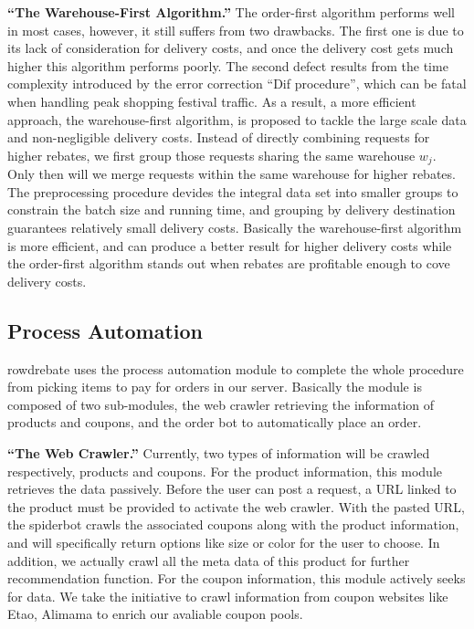 \textbf{``The Warehouse-First Algorithm.''} The order-first algorithm performs well in most cases, however, it still suffers from two drawbacks. The first one is due to its lack of consideration for delivery costs, and once the delivery cost gets much higher this algorithm performs poorly. The second defect results from the time complexity introduced by the error correction ``Dif procedure'', which can be fatal when handling peak shopping festival traffic. As a result, a more efficient approach, the warehouse-first algorithm, is proposed to tackle the large scale data and non-negligible delivery costs. Instead of directly combining requests for higher rebates, we first group those requests sharing the same warehouse $w_j$. Only then will we merge requests within the same warehouse for higher rebates. The preprocessing procedure devides the integral data set into smaller groups to constrain the batch size and running time, and grouping by delivery destination guarantees relatively small delivery costs. Basically the warehouse-first algorithm is more efficient, and can produce a better result for higher delivery costs while the order-first algorithm stands out when rebates are profitable enough to cove delivery costs.

\subsection{Process Automation}

rowdrebate uses the process automation module to complete the whole procedure from picking items to pay for orders in our server. Basically the module is composed of two sub-modules, the web crawler retrieving the information of products and coupons, and the order bot to automatically place an order. 

\textbf{``The Web Crawler.''} Currently, two types of information will be crawled respectively, products and coupons. For the product information, this module retrieves the data passively. Before the user can post a request, a URL linked to the product must be provided to activate the web crawler. With the pasted URL, the spiderbot crawls the associated coupons along with the product information, and will specifically return options like size or color for the user to choose. In addition, we actually crawl all the meta data of this product for further recommendation function. For the coupon information, this module actively seeks for data. We take the initiative to crawl information from coupon websites like Etao, Alimama to enrich our avaliable coupon pools. 


